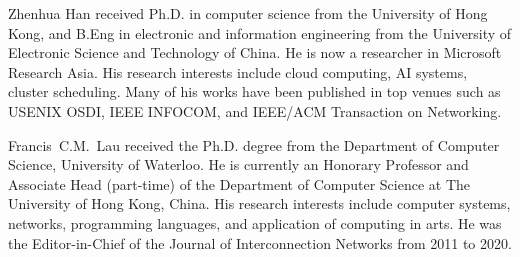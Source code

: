 \begin{IEEEbiography}{Zhenhua Han}
    received Ph.D. in computer science from the University of Hong Kong, and B.Eng in electronic and information engineering from the University of Electronic Science and Technology of China. He is now a researcher in Microsoft Research Asia. His research interests include cloud computing, AI systems, cluster scheduling. Many of his works have been published in top venues such as USENIX OSDI, IEEE INFOCOM, and IEEE/ACM Transaction on Networking.
\end{IEEEbiography}
\vspace{-1cm}

\begin{IEEEbiography}{Francis~C.M.~Lau}
    received the Ph.D. degree from the Department of Computer Science, University of Waterloo. He is currently an Honorary Professor and Associate Head (part-time) of the Department of Computer Science at The University of Hong Kong, China. His research interests include computer systems, networks, programming languages, and application of computing in arts. He was the Editor-in-Chief of the Journal of Interconnection Networks from 2011 to 2020.
\end{IEEEbiography}
\vspace{-1cm}
